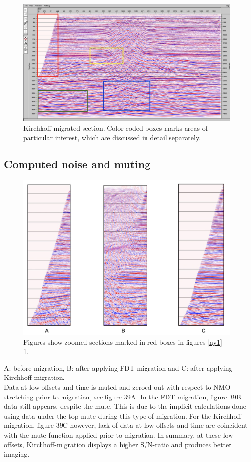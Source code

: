 \documentclass[10pt,a4paper]{article}
\begin{document}
\begin{figure}[H]
\includegraphics[width=\textwidth]{ny3.jpg}
\caption{Kirchhoff-migrated section. Color-coded boxes marks areas of particular interest, which are discussed in detail separately.}
\label{ny3}
\end{figure}

\subsection{Computed noise and muting}

\begin{figure}[H]
\includegraphics[width=\textwidth]{ny4.jpg}
\caption{Figures show zoomed sections marked in red boxes in figures \ref{ny1} - \ref{ny3}.}
\label{ny4}
\end{figure}

\noindent A: before migration, B: after applying FDT-migration and C: after applying Kirchhoff-migration. 
\\
Data at low offsets and time is muted and zeroed out with respect to NMO-stretching prior to migration, see figure 39A. In the FDT-migration, figure 39B data still appears, despite the mute. This is due to the implicit calculations done using data under the top mute during this type of migration. For the Kirchhoff-migration, figure 39C however, lack of data at low offsets and time are coincident with the mute-function applied prior to migration. In summary, at these low offsets, Kirchhoff-migration displays a higher S/N-ratio and produces better imaging. 
\end{document}
